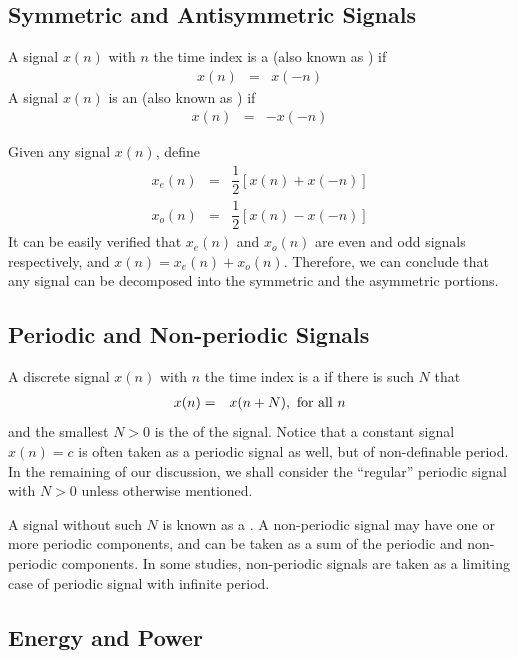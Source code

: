 \subsection{Symmetric and Antisymmetric Signals}

A signal $x(n)$ with $n$ the time index is a  (also known as ) if
\begin{eqnarray}
	x(n) &=& x(-n) \nonumber
\end{eqnarray}
A signal $x(n)$ is an  (also known as ) if
\begin{eqnarray}
	x(n) &=& -x(-n) \nonumber
\end{eqnarray}

Given any signal $x(n)$, define
\begin{eqnarray}
	x_e(n) &=& \dfrac{1}{2}\left[x(n) + x(-n)\right] \nonumber \\
	x_o(n) &=& \dfrac{1}{2}\left[x(n) - x(-n)\right] \nonumber
\end{eqnarray}
It can be easily verified that $x_e(n)$ and $x_o(n)$ are even and odd signals respectively, and $x(n) = x_e(n) + x_o(n)$. Therefore, we can conclude that any signal can be decomposed into the symmetric and the asymmetric portions.

\subsection{Periodic and Non-periodic Signals}

A discrete signal $x(n)$ with $n$ the time index is a  if there is such $N$ that
\begin{eqnarray}
	x(n) &=& x(n + N), \textup{~for all~} n \nonumber
\end{eqnarray}
and the smallest $N>0$ is the  of the signal. Notice that a constant signal $x(n)=c$ is often taken as a periodic signal as well, but of non-definable period. In the remaining of our discussion, we shall consider the ``regular'' periodic signal with $N>0$ unless otherwise mentioned.

A signal without such $N$ is known as a . A non-periodic signal may have one or more periodic components, and can be taken as a sum of the periodic and non-periodic components. In some studies, non-periodic signals are taken as a limiting case of periodic signal with infinite period.

\subsection{Energy and Power}

